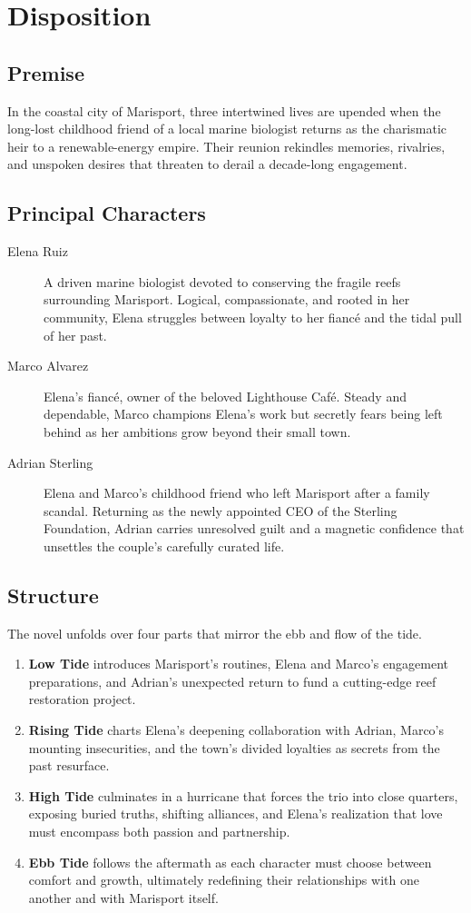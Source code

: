 \chapter*{Disposition}

\section*{Premise}
In the coastal city of Marisport, three intertwined lives are upended when the long-lost childhood friend of a local marine biologist returns as the charismatic heir to a renewable-energy empire. Their reunion rekindles memories, rivalries, and unspoken desires that threaten to derail a decade-long engagement.

\section*{Principal Characters}
\begin{description}
  \item[Elena Ruiz] A driven marine biologist devoted to conserving the fragile reefs surrounding Marisport. Logical, compassionate, and rooted in her community, Elena struggles between loyalty to her fiancé and the tidal pull of her past.
  \item[Marco Alvarez] Elena's fiancé, owner of the beloved Lighthouse Café. Steady and dependable, Marco champions Elena's work but secretly fears being left behind as her ambitions grow beyond their small town.
  \item[Adrian Sterling] Elena and Marco's childhood friend who left Marisport after a family scandal. Returning as the newly appointed CEO of the Sterling Foundation, Adrian carries unresolved guilt and a magnetic confidence that unsettles the couple's carefully curated life.
\end{description}

\section*{Structure}
The novel unfolds over four parts that mirror the ebb and flow of the tide.
\begin{enumerate}
  \item \textbf{Low Tide} introduces Marisport's routines, Elena and Marco's engagement preparations, and Adrian's unexpected return to fund a cutting-edge reef restoration project.
  \item \textbf{Rising Tide} charts Elena's deepening collaboration with Adrian, Marco's mounting insecurities, and the town's divided loyalties as secrets from the past resurface.
  \item \textbf{High Tide} culminates in a hurricane that forces the trio into close quarters, exposing buried truths, shifting alliances, and Elena's realization that love must encompass both passion and partnership.
  \item \textbf{Ebb Tide} follows the aftermath as each character must choose between comfort and growth, ultimately redefining their relationships with one another and with Marisport itself.
\end{enumerate}

